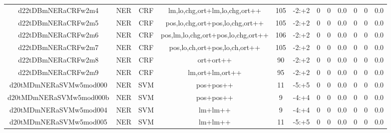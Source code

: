 \documentclass[a4paper]{article}
\begin{document}
\begin{landscape}
\begin{center}
\begin{tabular}{ |c|c|c|c|c|c|c|c|c|c|c|c|}
 
 	
 	\small{ d22tDBmNERaCRFw2m4 } & \small{ NER} & \small{  CRF }  & lm,lo,chg,ort+lm,lo,chg,ort++  &  105 &  \small{  -2:+2 }  &  0 & 0 & 0.0  &  0 & 0 & 0.0 \\
 	

 
 	
 	\small{ d22tDBmNERaCRFw2m5 } & \small{ NER} & \small{  CRF }  & pos,lo,chg,ort+pos,lo,chg,ort++  &  105 &  \small{  -2:+2 }  &  0 & 0 & 0.0  &  0 & 0 & 0.0 \\
 	

 
 	
 	\small{ d22tDBmNERaCRFw2m6 } & \small{ NER} & \small{  CRF }  & pos,lm,lo,chg,ort+pos,lo,chg,ort++  &  106 &  \small{  -2:+2 }  &  0 & 0 & 0.0  &  0 & 0 & 0.0 \\
 	

 
 	
 	\small{ d22tDBmNERaCRFw2m7 } & \small{ NER} & \small{  CRF }  & pos,lo,ch,ort+pos,lo,ch,ort++  &  105 &  \small{  -2:+2 }  &  0 & 0 & 0.0  &  0 & 0 & 0.0 \\
 	

 
 	
 	\small{ d22tDBmNERaCRFw2m8 } & \small{ NER} & \small{  CRF }  & ort+ort++  &  90 &  \small{  -2:+2 }  &  0 & 0 & 0.0  &  0 & 0 & 0.0 \\
 	

 
 	
 	\small{ d22tDBmNERaCRFw2m9 } & \small{ NER} & \small{  CRF }  & lm,ort+lm,ort++  &  95 &  \small{  -2:+2 }  &  0 & 0 & 0.0  &  0 & 0 & 0.0 \\
 	

 
 	
 	\small{ d20tMDmNERaSVMw5mod000 } & \small{ NER} & \small{  SVM }  & pos+pos++  &  11 &  \small{  -5:+5 }  &  0 & 0 & 0.0  &  0 & 0 & 0.0 \\
 	

 
 	
 	\small{ d20tMDmNERaSVMw5mod000b } & \small{ NER} & \small{  SVM }  & pos+pos++  &  9 &  \small{  -4:+4 }  &  0 & 0 & 0.0  &  0 & 0 & 0.0 \\
 	

 
 	
 	\small{ d20tMDmNERaSVMw5mod004 } & \small{ NER} & \small{  SVM }  & lm+lm++  &  9 &  \small{  -4:+4 }  &  0 & 0 & 0.0  &  0 & 0 & 0.0 \\
 	

 
 	
 	\small{ d20tMDmNERaSVMw5mod005 } & \small{ NER} & \small{  SVM }  & lm+lm++  &  11 &  \small{  -5:+5 }  &  0 & 0 & 0.0  &  0 & 0 & 0.0 \\
 	


\end{tabular}
\end{center}
\end{landscape}
\end{document}

